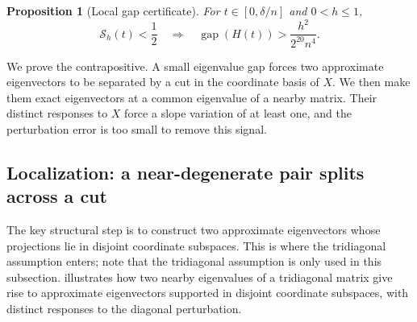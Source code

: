 \documentclass[10pt,a4paper]{article}
\newtheorem{proposition}{Proposition}[section]
\DeclareMathOperator{\gap}{gap}
\begin{document}
\begin{proposition}[Local gap certificate]\label{prop:bridge}
For $t\in[0,\delta/n]$ and $0<h\leq1$,
\begin{equation}\label{eq:bridge}
\boxed{\mathcal S_h(t)<\frac12\quad\Longrightarrow\quad
\gap(H(t))>\frac{h^2}{2^{20}n^4}.}
\end{equation}
\end{proposition}

We prove the contrapositive. A small eigenvalue gap forces two approximate
eigenvectors to be separated by a cut in the coordinate basis of $X$.
We then make them exact eigenvectors at a common eigenvalue of a nearby
matrix. Their distinct responses to $X$ force a slope variation of at
least one, and the perturbation error is too small to remove this signal.

\subsection{Localization: a near-degenerate pair splits across a cut}
\label{subsec:localization}

The key structural step is to construct two approximate eigenvectors whose
projections lie in disjoint coordinate subspaces. This is where the
tridiagonal assumption enters; note that the tridiagonal assumption is only used in this subsection. 
 illustrates how two nearby eigenvalues of a
tridiagonal matrix give rise to approximate eigenvectors
supported in disjoint coordinate subspaces, with
distinct responses to the diagonal perturbation.
\end{document}
